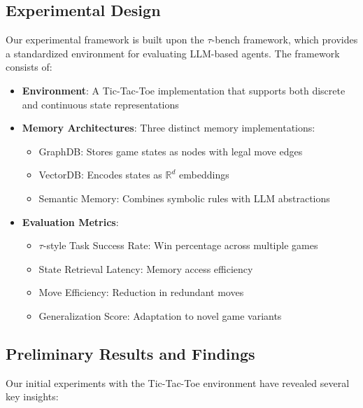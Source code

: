 \subsection{Experimental Design}
Our experimental framework is built upon the $\tau$-bench framework, which provides a standardized environment for evaluating LLM-based agents. The framework consists of:

\begin{itemize}
    \item \textbf{Environment}: A Tic-Tac-Toe implementation that supports both discrete and continuous state representations
    \item \textbf{Memory Architectures}: Three distinct memory implementations:
    \begin{itemize}
        \item GraphDB: Stores game states as nodes with legal move edges
        \item VectorDB: Encodes states as $\mathbb{R}^d$ embeddings
        \item Semantic Memory: Combines symbolic rules with LLM abstractions
    \end{itemize}
    \item \textbf{Evaluation Metrics}: 
    \begin{itemize}
        \item $\tau$-style Task Success Rate: Win percentage across multiple games
        \item State Retrieval Latency: Memory access efficiency
        \item Move Efficiency: Reduction in redundant moves
        \item Generalization Score: Adaptation to novel game variants
    \end{itemize}
\end{itemize}

\subsection{Preliminary Results and Findings}
Our initial experiments with the Tic-Tac-Toe environment have revealed several key insights:

